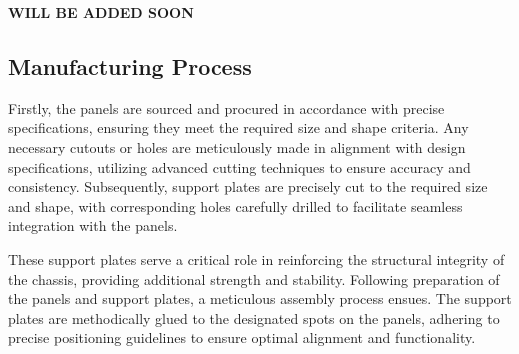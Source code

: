 \textbf{WILL BE ADDED SOON}

\subsection{Manufacturing Process}

Firstly, the panels are sourced and procured in accordance with precise specifications, ensuring they meet the required size and shape criteria. Any necessary cutouts or holes are meticulously made in alignment with design specifications, utilizing advanced cutting techniques to ensure accuracy and consistency. Subsequently, support plates are precisely cut to the required size and shape, with corresponding holes carefully drilled to facilitate seamless integration with the panels. 

These support plates serve a critical role in reinforcing the structural integrity of the chassis, providing additional strength and stability. Following preparation of the panels and support plates, a meticulous assembly process ensues. The support plates are methodically glued to the designated spots on the panels, adhering to precise positioning guidelines to ensure optimal alignment and functionality.

